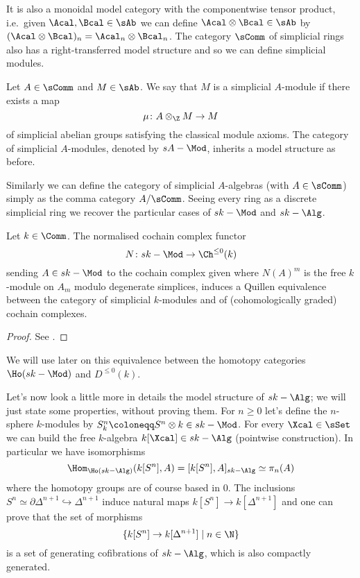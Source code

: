         It is also a monoidal model category with the componentwise tensor product, i.e.\ given $\Acal, \Bcal \in \sAb$ we can define $\Acal \otimes \Bcal \in \sAb$ by $(\Acal \otimes \Bcal)_n = \Acal_n \otimes \Bcal_n$.
        The category $\sComm$ of simplicial rings also has a right-transferred model structure and so we can define simplicial modules. 
        \begin{defn}
            \label{defn:simplicial_module}
            Let $A \in \sComm$ and $M \in \sAb$. We say that $M$ is a simplicial $A$-module if there exists a map \[\mu\colon A \otimes_{\Z} M \to M \] of simplicial abelian groups satisfying the classical module axioms.
            The category of simplicial $A$-modules, denoted by $sA-\Mod$, inherits a model structure as before.
        \end{defn}
        Similarly we can define the category of simplicial $A$-algebras (with $A \in \sComm$) simply as the comma category $A/\sComm$. Seeing every ring as a discrete simplicial ring we recover the particular cases of $sk-\Mod$ and $sk-\Alg$. 

        \begin{thm}
            \label{thm:dold_kan}
            Let $k \in \Comm$. The normalised cochain complex functor \[N\colon sk-\Mod \to \Ch^{\leq 0}(k) \] sending $A \in sk-\Mod$ to the cochain complex given where $N(A)^m$ is the free $k$-module on $A_m$ modulo degenerate simplices, induces a Quillen equivalence between the category of simplicial $k$-modules and of (cohomologically graded) cochain complexes.
        \end{thm}
        \begin{proof}
            See \cite[8.4.1]{Wei:hom_algebra}.
        \end{proof}

        We will use later on this equivalence between the homotopy categories $\Ho(sk-\Mod)$ and $D^{\leq 0}(k)$.
        
        Let's now look a little more in details the model structure of $sk-\Alg$; we will just state some properties, without proving them. For $n \geq 0$ let's define the $n$-sphere $k$-modules by $S^n_k \coloneqq S^n \otimes k \in sk-\Mod$. For every $\Xcal \in \sSet$ we can build the free $k$-algebra $k[\Xcal] \in sk-\Alg$ (pointwise construction). In particular we have isomorphisms \[\Hom_{\Ho(sk-\Alg)}(k[S^n], A) = [k[S^n], A]_{sk-\Alg} \simeq \pi_n(A) \] where the homotopy groups are of course based in $0$. The inclusions $S^n \simeq \partial \Delta^{n+1} \hookrightarrow \Delta^{n+1}$ induce natural maps $k[S^n] \to k[\Delta^{n+1}]$ and one can prove that the set of morphisms \[\{k[S^n] \to k[\Delta^{n+1}] \mid n \in \N \} \] is a set of generating cofibrations of $sk-\Alg$, which is also compactly generated.

